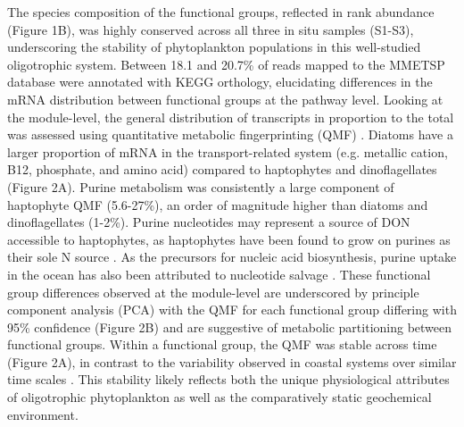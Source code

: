 The species composition of the functional groups, reflected in rank abundance (Figure 1B), was highly conserved across all three in situ samples (S1-S3), underscoring the stability of phytoplankton populations in this well-studied oligotrophic system. Between 18.1 and 20.7\% of reads mapped to the MMETSP database were annotated with KEGG orthology, elucidating differences in the mRNA distribution between functional groups at the pathway level. Looking at the module-level, the general distribution of transcripts in proportion to the total was assessed using quantitative metabolic fingerprinting (QMF) \citep{Alexander2015}. Diatoms have a larger proportion of mRNA in the transport-related system (e.g. metallic cation, B12, phosphate, and amino acid) compared to haptophytes and dinoflagellates (Figure 2A). Purine metabolism was consistently a large component of haptophyte QMF (5.6-27\%), an order of magnitude higher than diatoms and dinoflagellates (1-2\%). Purine nucleotides may represent a source of DON accessible to haptophytes, as haptophytes have been found to grow on purines as their sole N source \citep{Palenik1997}. As the precursors for nucleic acid biosynthesis, purine uptake in the ocean has also been attributed to nucleotide salvage \citep{Winn1984}. These functional group differences observed at the module-level are underscored by principle component analysis (PCA) with the QMF for each functional group differing with 95\% confidence (Figure 2B) and are suggestive of metabolic partitioning between functional groups. Within a functional group, the QMF was stable across time (Figure 2A), in contrast to the variability observed in coastal systems over similar time scales \citep{Alexander2015, Dupont2015}. This stability likely reflects both the unique physiological attributes of oligotrophic phytoplankton as well as the comparatively static geochemical environment. \par
